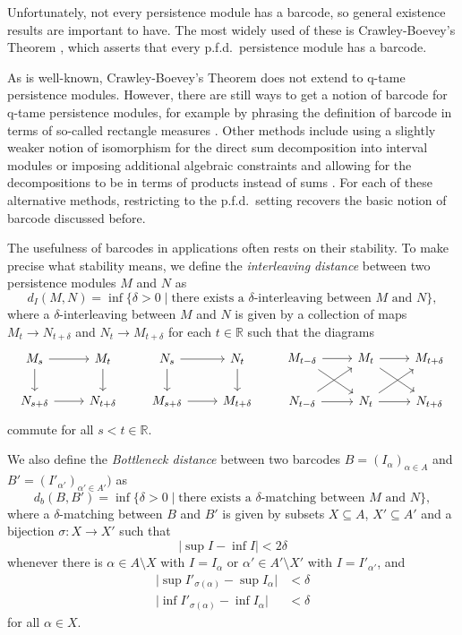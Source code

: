 Unfortunately, not every persistence module has a barcode, so general existence results are important to have. The most widely used of these is Crawley-Boevey's Theorem \cite{Crawley-Boevey.2015}, which asserts that every p.f.d.\ persistence module has a barcode. 

As is well-known, Crawley-Boevey's Theorem does not extend to q-tame persistence modules. However, there are still ways to get a notion of barcode for q-tame persistence modules, for example by phrasing the definition of barcode in terms of so-called rectangle measures \cite{Chazal.2016a}. Other methods include using a slightly weaker notion of isomorphism for the direct sum decomposition into interval modules \cite{Chazal.2016b} or imposing additional algebraic constraints and allowing for the decompositions to be in terms of products instead of sums \cite{schmahl2020structure}. For each of these alternative methods, restricting to the p.f.d.\ setting recovers the basic notion of barcode discussed before.

The usefulness of barcodes in applications often rests on their stability. To make precise what stability means, we define the \emph{interleaving distance} between two persistence modules $M$ and $N$ as 
\[
d_{I}(M,N)=\inf\{\delta>0\mid\text{there exists a }\delta\text{-interleaving between }M\text{ and }N\},
\]
where a $\delta$-interleaving between $M$ and $N$ is given by a collection of maps $M_{t}\to N_{t+\delta}$ and $N_{t}\to M_{t+\delta}$ for each $t\in\mathbb{R}$ such that the diagrams
\[
\begin{tikzcd}
M_s\arrow[r]\arrow[d] & M_t\arrow[d] \\
N_{s+\delta}\arrow[r] & N_{t+\delta}
\end{tikzcd}
\qquad
\begin{tikzcd}
N_s\arrow[r]\arrow[d] & N_t\arrow[d] \\
M_{s+\delta}\arrow[r] & M_{t+\delta}
\end{tikzcd}
\qquad
\begin{tikzcd}
M_{t-\delta}\arrow[rd]\arrow[r]& M_{t}\arrow[rd]\arrow[r] & M_{t+\delta} \\
N_{t-\delta}\arrow[ru]\arrow[r]& N_{t}\arrow[ru]\arrow[r] & N_{t+\delta}
\end{tikzcd}
\]
commute for all $s<t\in\mathbb{R}$.

We also define the \emph{Bottleneck distance} between two barcodes $B=(I_{\alpha})_{\alpha\in A}$ and $B'=(I'_{\alpha'})_{\alpha'\in A'})$ as
\[
d_{b}(B,B')=\inf\{\delta>0\mid\text{there exists a }\delta\text{-matching between }M\text{ and }N\},
\]
where a $\delta$-matching between $B$ and $B'$ is given by subsets $X\subseteq A$, $X'\subseteq A'$ and a bijection $\sigma\colon X\to X'$ such that
\[
\lvert \sup I - \inf I \rvert < 2\delta
\]
whenever there is $\alpha\in A\setminus X$ with $I=I_{\alpha}$ or $\alpha'\in A'\setminus X'$ with $I=I'_{\alpha'}$, and
\begin{align*}
\lvert \sup I'_{\sigma(\alpha)} - \sup I_{\alpha} \rvert &< \delta \\
\lvert \inf I'_{\sigma(\alpha)} - \inf I_{\alpha} \rvert &< \delta
\end{align*}
for all $\alpha\in X$.

